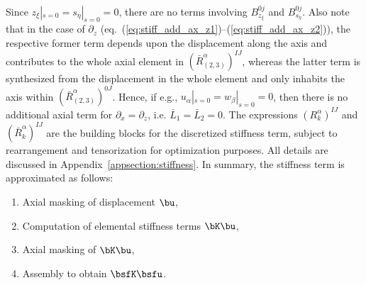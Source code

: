 \label{eq:stiff_add_ax_z1}\\
\label{eq:stiff_add_ax_z2}
\ena
%
Since $z_\xi|_{s=0}=s_\eta|_{s=0}=0$, there are no terms involving 
$B^{0j}_{z_\xi}$ and $B^{0j}_{s_\eta}$.
Also note that in the case of $\partial_z$ 
(eq.~(\ref{eq:stiff_add_ax_z1})--(\ref{eq:stiff_add_ax_z2})), the respective 
former term depends upon the displacement along the axis and contributes to 
the whole axial element in $(\bar{R}^\alpha_{(2,3)})^{IJ}$, whereas the latter 
term is synthesized from the displacement in the whole element and only 
inhabits the axis within $(\bar{R}^\alpha_{(2,3)})^{0J}$. Hence, if e.g., 
$u_\alpha|_{s=0}=w_\beta|_{s=0}=0$, then there is no additional axial term 
for $\partial_x=\partial_z$, i.e. $\bar{L}_1=\bar{L}_2=0$.
%
The expressions $(R_k^\alpha)^{IJ}$ and 
$(\bar{R}_k^\alpha)^{IJ}$ are the building blocks for the discretized 
stiffness term, subject to rearrangement and tensorization 
for optimization purposes. All details are discussed in 
Appendix~\ref{appsection:stiffness}. In summary, the stiffness term is 
approximated as follows:
%
\begin{enumerate}
\item Axial masking of displacement $\bu$,
\item Computation of elemental stiffness terms $\bK\bu$,
\item Axial masking of $\bK\bu$,
\item Assembly to obtain $\bsfK\bsfu$.
\end{enumerate}
%
